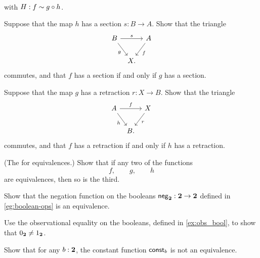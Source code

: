 \begin{exercises}
\begin{equation*}
\begin{tikzcd}[column sep=tiny]
    \end{tikzcd}
  \end{equation*}
  with $H:f\sim g\circ h$.
  \begin{subexenum}
  \item Suppose that the map $h$ has a section $s:B \to A$. Show that the triangle
    \begin{equation*}
      \begin{tikzcd}[column sep=tiny]
        B \arrow[rr,"s"] \arrow[dr,swap,"g"] & & A \arrow[dl,"f"] \\
        & X.
      \end{tikzcd}
    \end{equation*}
    commutes, and that $f$ has a section if and only if $g$ has a section.
  \item Suppose that the map $g$ has a retraction $r:X\to B$. Show that the triangle
    \begin{equation*}
      \begin{tikzcd}[column sep=tiny]
        A \arrow[rr,"f"] \arrow[dr,swap,"h"] & & X \arrow[dl,"r"] \\
        & B.
      \end{tikzcd}
    \end{equation*}
    commutes, and that $f$ has a retraction if and only if $h$ has a retraction.
  \item (The  for equivalences.) Show that if any two of the functions
    \begin{equation*}
      f,\qquad g,\qquad h
    \end{equation*}
    are equivalences, then so is the third.
  \end{subexenum}
\item \label{ex:neg_equiv} 
  \begin{subexenum}
  \item Show that the negation function on the booleans $\mathsf{neg}_{\mathbf{2}}:\mathbf{2}\to\mathbf{2}$ defined in \cref{eg:boolean-ops} is an equivalence.
  \item Use the observational equality on the booleans, defined in \cref{ex:obs_bool}, to show that ${0_{\mathbf{2}}}\neq{1_{\ensuremath{\mathbf{2}}}}$.
  \item Show that for any $b:\mathbf{2}$, the constant function $\mathsf{const}_b$ is not an equivalence.

\end{subexenum}
\end{exercises}
